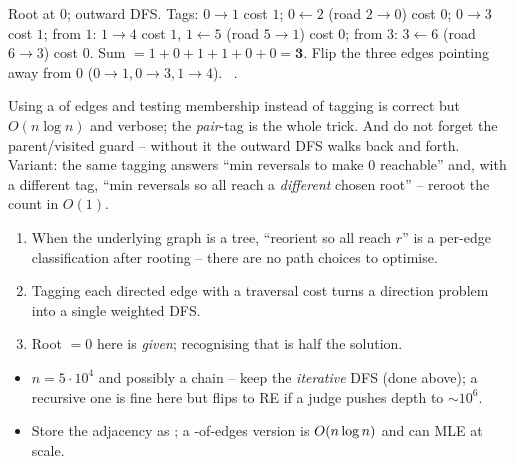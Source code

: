 \begin{tracebox}
Root at $0$; outward DFS. Tags: $0\!\to\!1$ cost $1$; $0\!\leftarrow\!2$ (road $2\to0$) cost $0$;
$0\!\to\!3$ cost $1$; from $1$: $1\!\to\!4$ cost $1$, $1\!\leftarrow\!5$ (road $5\to1$) cost $0$;
from $3$: $3\!\leftarrow\!6$ (road $6\to3$) cost $0$. Sum $=1{+}0{+}1{+}1{+}0{+}0=\mathbf{3}$.
Flip the three edges pointing away from $0$ ($0\to1,0\to3,1\to4$). \checkmark\ .
\end{tracebox}


\begin{warningbox}
Using a  of edges and testing membership instead of tagging is correct but
$O(n\log n)$ and verbose; the \emph{pair}-tag is the whole trick. And do not forget the
parent/visited guard -- without it the outward DFS walks back and forth. Variant: the same
tagging answers ``min reversals to make $0$ reachable'' and, with a different tag, ``min
reversals so all reach a \emph{different} chosen root'' -- reroot the count in $O(1)$.
\end{warningbox}

\begin{insightbox}
\begin{enumerate}[nosep, leftmargin=1.6em]
  \item When the underlying graph is a tree, ``reorient so all reach $r$'' is a per-edge
        classification after rooting -- there are no path choices to optimise.
  \item Tagging each directed edge with a traversal cost turns a direction problem into a
        single weighted DFS.
  \item Root $=0$ here is \emph{given}; recognising that is half the solution.
\end{enumerate}
\end{insightbox}

\begin{hardeningbox}
\begin{itemize}[nosep, leftmargin=1.4em]
  \item $n=5\cdot10^4$ and possibly a chain -- keep the \emph{iterative} DFS (done above);
        a recursive one is fine here but flips to RE if a judge pushes depth to $\sim10^6$.
  \item Store the adjacency as ; a -of-edges
        version is $O(n\log n)$ and can MLE at scale.
\end{itemize}
\end{hardeningbox}

